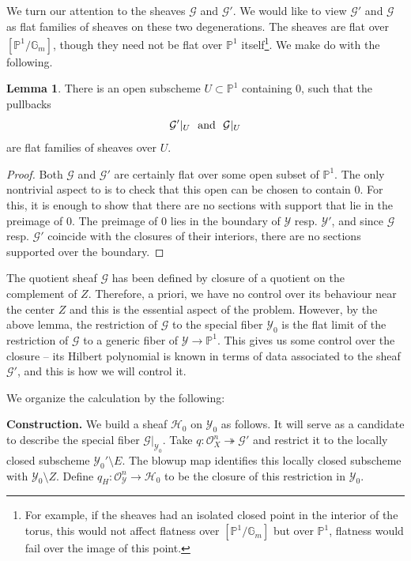 \documentclass[11pt]{amsart}
\theoremstyle{definition}
\theoremstyle{definition}
\newtheorem{lemma}[theorem]{Lemma}
\newcommand{\cG}{\mathcal{G}}
\newcommand{\cY}{\mathcal{Y}}
\newcommand{\cal}{\mathcal}
\def\cY{{\cal Y}}
\begin{document}
We turn our attention to the sheaves $\mathcal G$ and $\mathcal G'$. We would like to view $\mathcal G'$ and $\mathcal G$ as flat families of sheaves on these two degenerations. The sheaves are flat over $[\mathbb P^1/\mathbb G_m]$, though they need not be flat over $\mathbb P^1$ itself\footnote{For example, if the sheaves had an isolated closed point in the interior of the torus, this would not affect flatness over $[\mathbb P^1/\mathbb G_m]$ but over $\mathbb P^1$, flatness would fail over the image of this point.}. We make do with the following. 

\begin{lemma}
There is an open subscheme $U\subset \mathbb P^1$ containing $0$, such that the pullbacks 
\[
\mathcal G'|_U \ \ \textnormal{and} \ \ \mathcal G|_U
\]
are flat families of sheaves over $U$. 
\end{lemma}

\begin{proof}
Both $\mathcal G$ and $\mathcal G'$ are certainly flat over some open subset of $\mathbb P^1$. The only nontrivial aspect to is to check that this open can be chosen to contain $0$. For this, it is enough to show that there are no sections with support that lie in the preimage of $0$. The preimage of $0$ lies in the boundary of $\cY$ resp. $\cY'$, and since $\mathcal G$ resp. $\mathcal G'$ coincide with the closures of their interiors, there are no sections supported over the boundary. 
\end{proof}

The quotient sheaf $\mathcal G$ has been defined by closure of a quotient on the complement of $Z$. Therefore, a priori, we have no control over its behaviour near the center $Z$ and this is the essential aspect of the problem. However, by the above lemma, the restriction of $\mathcal G$ to the special fiber $\mathcal Y_0$ is the flat limit of the restriction of $\mathcal G$ to a generic fiber of $\mathcal Y\to\mathbb P^1$. This gives us some control over the closure -- its Hilbert polynomial is known in terms of data associated to the sheaf $\mathcal G'$, and this is how we will control it. 

We organize the calculation by the following:

\noindent
{\bf Construction.} We build a sheaf $\mathcal H_0$ on $\mathcal Y_0$ as follows. It will serve as a candidate to describe the special fiber $\mathcal G|_{\mathcal Y_0}$. Take $q\colon \mathcal{O}_X^n\twoheadrightarrow \cG'$ and restrict it to the locally closed subscheme $\mathcal Y_0'\setminus E$. The blowup map identifies this locally closed subscheme with $\mathcal Y_0\setminus Z$. Define $q_H\colon \mathcal{O}_\mathcal{Y}^n\rightarrow \mathcal H_0$ to be the closure of this restriction in $\mathcal Y_0$. 
\end{document}
